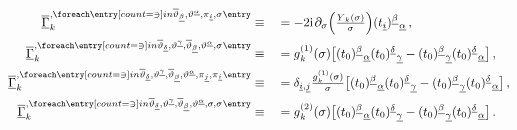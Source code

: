 \begin{alignat}{2}
\FSvertexArg{\FSeaaEoM}{\overline{\vartheta} {}_{\underline{\beta}},{\vartheta} \text{}^{\underline{\alpha}},{\pi} {}_{\underline{i}},\sigma}&\equiv&&=-2 \iu \vts \partial_{\sigma}\Big(\tfrac{\FScoupling{Y}{0}{\sigma}}{\sigma }\Big) \suIItij{\underline{i}}{\underline{\beta}}{\underline{\alpha}}\, , \\ 
\FSvertexArg{\FSeaaEoM}{\overline{\vartheta} {}_{\underline{\delta}},{\vartheta} \text{}^{\underline{\gamma}},\overline{\vartheta} {}_{\underline{\beta}},{\vartheta} \text{}^{\underline{\alpha}},\sigma}&\equiv&&=\FScoupling{g}{1}{\sigma} \big[\suIItij{0}{\underline{\beta}}{\underline{\alpha}} \suIItij{0}{\underline{\delta}}{\underline{\gamma}}-\suIItij{0}{\underline{\beta}}{\underline{\gamma}} \suIItij{0}{\underline{\delta}}{\underline{\alpha}}\big]\, , \\ 
\FSvertexArg{\FSeaaEoM}{\overline{\vartheta} {}_{\underline{\delta}},{\vartheta} \text{}^{\underline{\gamma}},\overline{\vartheta} {}_{\underline{\beta}},{\vartheta} \text{}^{\underline{\alpha}},{\pi} {}_{\underline{j}},{\pi} {}_{\underline{i}}}&\equiv&&=\delta_{\underline{i},\underline{j}} \tfrac{\FScoupling{g}{1}{\sigma}}{\sigma } \big[\suIItij{0}{\underline{\beta}}{\underline{\alpha}} \suIItij{0}{\underline{\delta}}{\underline{\gamma}}-\suIItij{0}{\underline{\beta}}{\underline{\gamma}} \suIItij{0}{\underline{\delta}}{\underline{\alpha}}\big]\, , \\ 
\FSvertexArg{\FSeaaEoM}{\overline{\vartheta} {}_{\underline{\delta}},{\vartheta} \text{}^{\underline{\gamma}},\overline{\vartheta} {}_{\underline{\beta}},{\vartheta} \text{}^{\underline{\alpha}},\sigma,\sigma}&\equiv&&=\FScoupling{g}{2}{\sigma} \big[\suIItij{0}{\underline{\beta}}{\underline{\alpha}} \suIItij{0}{\underline{\delta}}{\underline{\gamma}}-\suIItij{0}{\underline{\beta}}{\underline{\gamma}} \suIItij{0}{\underline{\delta}}{\underline{\alpha}}\big]\,.
\end{alignat}

\renewcommand{\FSk}{k}
